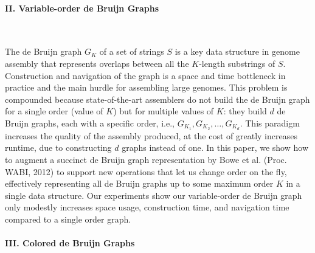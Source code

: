 \paragraph{II. Variable-order de Bruijn Graphs} \

\noindent
The de Bruijn graph $G_K$ of a set of strings $S$ is a key data structure in 
genome assembly that represents overlaps between all the $K$-length substrings 
of $S$. Construction and navigation of the graph is a space and time bottleneck 
in practice and the main hurdle for assembling large genomes. 
This problem is compounded because state-of-the-art assemblers do not build the de Bruijn graph for a single order (value of $K$) but for multiple values of $K$: they build $d$ de Bruijn graphs, each with a specific order, i.e., $G_{K_1}, G_{K_2}, \ldots, G_{K_d}$.  
This paradigm increases the quality of the assembly produced, at the cost of greatly increases runtime, due to constructing $d$ graphs instead of one.
In this paper, we show how to augment a succinct de Bruijn graph 
representation by Bowe et al. (Proc. WABI, 2012) 
to support new operations that let us change order on the fly, effectively
representing all de Bruijn graphs up to some maximum order $K$ in
a single data structure. 
Our experiments show our variable-order de Bruijn graph only modestly increases
space usage, construction time, and navigation time compared to a single order graph.

\paragraph{III. Colored de Bruijn Graphs} \

